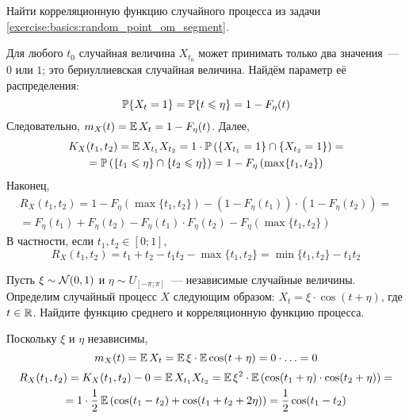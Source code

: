 \begin{exercise}
    \label{exercise:basics:random_point_om_segment_moments}
    Найти корреляционную функцию случайного процесса из задачи \ref{exercise:basics:random_point_om_segment}.
\end{exercise}

\begin{solution}
    Для любого $ t_0 $ случайная величина $ X_{t_0} $ может принимать только два значения~--- $ 0 $ или $ 1 $;
    это бернуллиевская случайная величина.
    Найдём параметр её распределения:
    \[
        \mathbb{P} \{X_t = 1\} = \mathbb{P} \{t \leqslant \eta\} = 1 - F_\eta(t)
    \]
    Следовательно, $ m_X(t) = \operatorname{\mathbb{E}} X_t = 1 - F_\eta(t) $.
    Далее,
    \begin{multline*}
        K_X(t_1, t_2) = \operatorname{\mathbb{E}} X_{t_1} X_{t_2} = 1 \cdot \mathbb{P} \left( \{X_{t_1} = 1\} \cap \{X_{t_2} = 1\} \right) = \\
        = \mathbb{P} \left( \{t_1 \leqslant \eta\} \cap \{t_2 \leqslant \eta\} \right) = 1 - F_\eta\left( \max \{t_1, t_2\} \right)
    \end{multline*}
    Наконец,
    \begin{multline*}
        R_X(t_1, t_2) = 1 - F_\eta\left( \max \{t_1, t_2\} \right) - (1 - F_\eta(t_1)) \cdot (1 - F_\eta(t_2)) = \\
        = F_\eta(t_1) + F_\eta(t_2) - F_\eta(t_1) \cdot F_\eta(t_2) - F_\eta(\max\{t_1, t_2\})
    \end{multline*}
    В частности, если $ t_1, t_2 \in [0; 1] $,
    \[
        R_X(t_1, t_2) = t_1 + t_2 - t_1 t_2 - \max\{t_1, t_2\} = \min\{t_1, t_2\} - t_1 t_2
    \]
\end{solution}

\begin{exercise}
    \label{exercise:basics:cosine_stochastic_process}
    Пусть $ \xi \sim \mathcal{N}(0, 1) $ и $ \eta \sim U_{[-\pi; \pi]} $~--- независимые случайные величины.
    Определим случайный процесс $ X $ следующим образом: $ X_t = \xi \cdot \cos(t + \eta) $, где $ t \in \mathbb{R} $.
    Найдите функцию среднего и корреляционную функцию процесса.
\end{exercise}

\begin{solution}
    Поскольку $ \xi $ и $ \eta $ независимы,
    \[
        m_X(t) = \operatorname{\mathbb{E}} X_t = \operatorname{\mathbb{E}} \xi \cdot \operatorname{\mathbb{E}} \cos(t + \eta) = 0 \cdot \ldots = 0
    \]
    \begin{multline*}
        R_X(t_1, t_2) = K_X(t_1, t_2) - 0 = \operatorname{\mathbb{E}} X_{t_1} X_{t_2} = \operatorname{\mathbb{E}} \xi^2 \cdot \operatorname{\mathbb{E}} \left( \cos(t_1 + \eta) \cdot \cos(t_2 + \eta) \right) = \\
        = 1 \cdot \frac{1}{2} \operatorname{\mathbb{E}} \left( \cos(t_1 - t_2) + \cos(t_1 + t_2 + 2 \eta) \right) = \frac{1}{2} \cos(t_1 - t_2)
    \end{multline*}
\end{solution}

